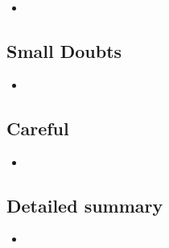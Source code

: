     \begin{itemize}

    \item 
    
    \end{itemize}

\subsection{Small Doubts}

    \begin{itemize}

    \item 
    
    \end{itemize}

\subsection{Careful}

    \begin{itemize}

    \item 
    
    \end{itemize}

\subsection{Detailed summary}

    \begin{itemize}

    \item 
    
    \end{itemize}